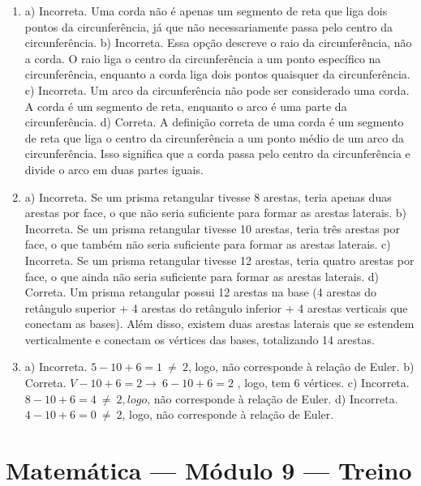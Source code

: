 \begin{enumerate}
\item a) Incorreta. Uma corda não é apenas um segmento de reta que liga dois pontos da circunferência, já que não necessariamente passa pelo centro da circunferência.
b) Incorreta. Essa opção descreve o raio da circunferência, não a corda. O raio liga o centro da circunferência a um ponto específico na
circunferência, enquanto a corda liga dois pontos quaisquer da circunferência.
c) Incorreta. Um arco da circunferência não pode ser considerado uma corda. A corda é um segmento de reta, enquanto o arco é uma parte da circunferência.
d) Correta. A definição correta de uma corda é um segmento de reta que liga o centro da circunferência a um ponto médio de um arco da
circunferência. Isso significa que a corda passa pelo centro da circunferência e divide o arco em duas partes iguais.

\item a) Incorreta. Se um prisma retangular tivesse 8 arestas, teria apenas duas arestas por face, o que não seria suficiente para formar as arestas laterais.
b) Incorreta. Se um prisma retangular tivesse 10 arestas, teria três arestas por face, o que também não seria suficiente para formar as arestas laterais.
c) Incorreta. Se um prisma retangular tivesse 12 arestas, teria quatro arestas por face, o que ainda não seria suficiente para formar as arestas laterais.
d) Correta. Um prisma retangular possui 12 arestas na base (4 arestas do retângulo superior + 4 arestas do retângulo inferior + 4 arestas verticais que conectam as bases). Além disso, existem duas
arestas laterais que se estendem verticalmente e conectam os vértices
das bases, totalizando 14 arestas.

\item a) Incorreta. $5 - 10 + 6 = 1\  \neq \ 2$, logo, não corresponde à relação de Euler.
b) Correta. $V - 10 + 6 = 2 \rightarrow \ 6 - 10 + 6 = 2$ , logo, tem 6 vértices.
c) Incorreta. $8 - 10 + 6 = 4\  \neq \ 2, logo$, não corresponde à relação de Euler.
d) Incorreta. $4 - 10 + 6 = 0\  \neq \ 2$, logo, não corresponde à relação de Euler.
\end{enumerate}

\section*{Matemática — Módulo 9 — Treino}

